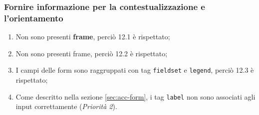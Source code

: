 \subsubsection{Fornire informazione per la contestualizzazione e
l'orientamento}
\begin{enumerate}
\item Non sono presenti \textbf{frame}, perciò 12.1 è rispettato;
\item Non sono presenti frame, perciò 12.2 è rispettato;
\item I campi delle form sono raggruppati con tag \texttt{fieldset} e
\texttt{legend}, perciò 12.3 è rispettato;
\item Come descritto nella sezione \ref{sec:acc-form}, i tag \texttt{label}
non sono associati agli input correttamente (\textit{Priorità 2}).
\end{enumerate}

